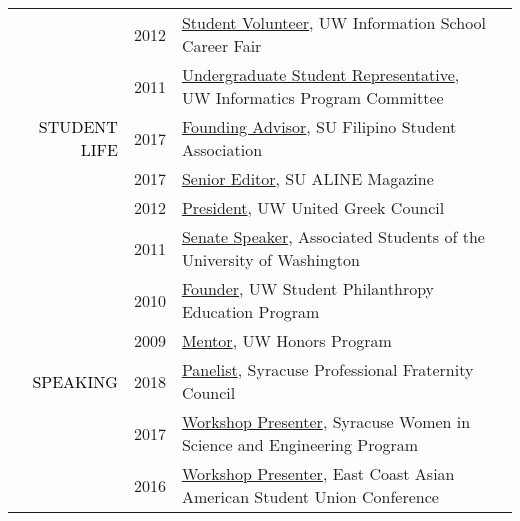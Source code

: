 \documentclass[12pt]{article}
\begin{document}
{{\begin{longtable}{Rp{1.0in}p{0.25in}p{4.75in}}
& \footnotesize{2012} & \href{https://web.archive.org/web/20130104065107/https://ischool.uw.edu/news/2012/11/annual-ischool-research-fair-showcases-faculty-and-student-work}{{Student Volunteer}}, UW Information School Career Fair \\

& \footnotesize{2011} & \href{https://ischool.uw.edu/about/leadership}{{Undergraduate Student Representative}}, UW Informatics Program Committee \\

\textcolor{black}{\footnotesize{\uppercase{Student Life}}} & \footnotesize{2017} & 
 \href{https://www.facebook.com/syracusefsa/}{{Founding Advisor}}, SU Filipino Student Association \\

& \footnotesize{2017} & \href{https://issuu.com/alinemagazine}{{Senior Editor}}, SU ALINE Magazine \\

& \footnotesize{2012} & \href{http://www.dailyuw.com/news/article_3c781595-0b4d-52be-9a6e-b2c956ae72eb.html}{{President}}, UW United Greek Council \\

& \footnotesize{2011} & \href{http://www.dailyuw.com/news/article_da48b049-d2a0-582c-9dfb-4589755ff1e5.html}{{Senate Speaker}}, Associated Students of the University of Washington \\

& \footnotesize{2010} & \href{https://www.washington.edu/giving/get-involved/for-students/real-dawgs-give-back/}{{Founder}}, UW Student Philanthropy Education Program \\

& \footnotesize{2009} & \href{http://depts.washington.edu/uwhonors/community/grads/12\_13/\#bdosono}{{Mentor}}, UW Honors Program \\

\textcolor{black}{\footnotesize{\uppercase{Speaking}}} & \footnotesize{2018} & \href{https://www.facebook.com/events/170505843576915/}{{Panelist}}, Syracuse Professional Fraternity Council \\

& \footnotesize{2017} & \href{http://www.suwise.syr.edu/}{{Workshop Presenter}}, Syracuse Women in Science and Engineering Program \\

& \footnotesize{2016} & \href{http://www.ecaasu.org/}{{Workshop Presenter}}, East Coast Asian American Student Union Conference \\


\end{longtable}}}
\end{document}
